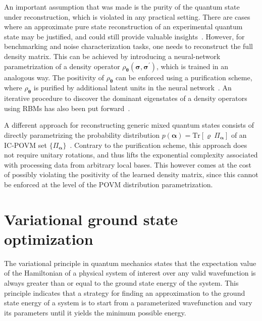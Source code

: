 \documentclass[twocolumn,english,reprint,superscriptaddress,longbibliography,pra]{revtex4-1}
\newcommand{\tr}{\textrm{Tr}}
\begin{document}
An important assumption that was made is the purity of the quantum state under reconstruction, which is violated in any practical setting. There are cases where an approximate pure state reconstruction of an experimental quantum state  may be justified, and could still provide valuable insights~\cite{torlai_rydberg19}. However, for benchmarking and noise characterization tasks, one needs to reconstruct the full density matrix. This can be achieved by introducing a neural-network parametrization of a density operator $\rho_{\bm\theta}(\bm\sigma,\bm\sigma^\prime)$, which is trained in an analogous way. The positivity of $\rho_{\bm\theta}$ can be enforced using a purification scheme, where $\rho_{\bm\theta}$ is purified by additional latent units in the neural network~\cite{Torlai_latent}. An iterative procedure to discover the dominant eigenstates of a density operators using RBMs has also been put forward~\cite{PhysRevA.102.022412}.

A different approach for reconstructing generic mixed quantum states consists of directly parametrizing the probability distribution $p(\bm\alpha) = \tr[\bm{\varrho}\:\Pi_{\bm\alpha}]$ of an IC-POVM set $\{\Pi_{\bm\alpha}\}$~\cite{carrasquilla_povm}. Contrary to the purification scheme, this approach does not require unitary rotations, and thus lifts the exponential complexity associated with processing data from arbitrary local bases. This however comes at the cost of possibly violating the positivity of the learned density matrix, since this cannot be enforced at the level of the POVM distribution parametrization.







\section{Variational ground state optimization}
\label{vmc}
The variational principle in quantum mechanics states that the expectation value of the Hamiltonian of a physical system of interest over any valid wavefunction is always greater than or equal to the ground state energy of the system. This principle indicates that a strategy for finding an approximation to the ground state energy of a system is to start from a parameterized wavefunction and vary its parameters until it yields the minimum possible energy. 
\end{document}
